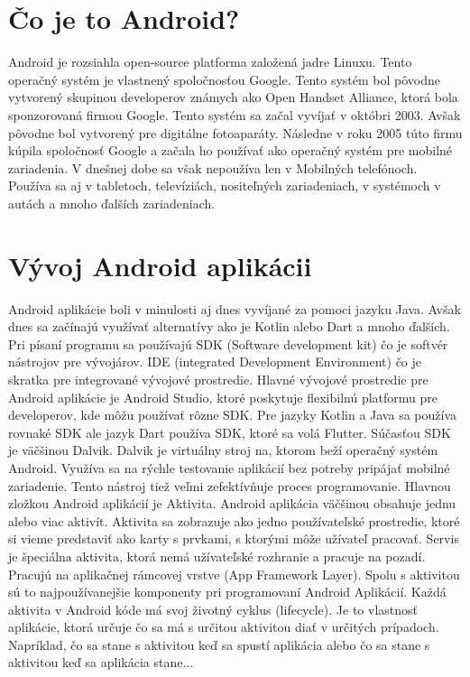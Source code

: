 \documentclass[10pt,twoside,slovak,a4paper]{article}
\begin{document}
\section{Čo je to Android?} \label{Čo je to Android?}
Android je rozsiahla open-source platforma založená jadre Linuxu. Tento operačný systém je vlastnený spoločnosťou Google. Tento systém bol pôvodne vytvorený skupinou developerov známych ako Open Handset Alliance, ktorá bola sponzorovaná firmou Google. \newline
Tento systém sa začal vyvíjať v októbri 2003. Avšak pôvodne bol vytvorený pre digitálne fotoaparáty. Následne v roku 2005 túto firmu kúpila spoločnosť Google a začala ho používať ako operačný systém pre mobilné zariadenia. \newline
V dnešnej dobe sa však nepoužíva len v  Mobilných telefónoch. Používa sa aj v tabletoch, televíziách, nositeľných zariadeniach, v systémoch v autách a mnoho ďalších zariadeniach.



\section{Vývoj Android aplikácii } \label{Vývoj Android aplikácii}

Android aplikácie boli v minulosti aj dnes vyvíjané za pomoci jazyku Java.\cite{9032440} Avšak dnes sa začínajú využívať alternatívy ako je Kotlin alebo Dart a mnoho ďalších. Pri písaní programu sa používajú SDK (Software development kit) čo je softvér nástrojov pre vývojárov. IDE (integrated Development Environment) čo je skratka pre integrované vývojové prostredie. \newline
Hlavné vývojové prostredie pre Android aplikácie je Android Studio, ktoré poskytuje flexibilnú platformu pre developerov, kde môžu používať rôzne SDK. Pre jazyky Kotlin a Java sa používa rovnaké SDK ale jazyk Dart používa SDK, ktoré sa volá Flutter. \newline
Súčasťou SDK je väčšinou Dalvik. Dalvik je virtuálny stroj na, ktorom beží operačný systém Android. Využíva sa na rýchle testovanie aplikácií bez potreby pripájať mobilné zariadenie. Tento nástroj tiež veľmi zefektívňuje proces programovanie.\newline
Hlavnou zložkou Android aplikácií je Aktivita. Android aplikácia väčšinou obsahuje jednu alebo viac aktivít. Aktivita sa zobrazuje ako jedno používateľské prostredie, ktoré si vieme predstaviť ako karty s prvkami, s ktorými môže užívateľ pracovať.\newline
Servis je špeciálna aktivita, ktorá nemá užívateľské rozhranie a pracuje na pozadí. Pracujú na aplikačnej rámcovej vrstve (App Framework Layer). Spolu s aktivitou sú to najpoužívanejšie komponenty pri programovaní Android Aplikácií. \newline
Každá aktivita v Android kóde má svoj životný cyklus (lifecycle). Je to vlastnosť aplikácie, ktorá určuje čo sa má s určitou aktivitou diať v určitých prípadoch. Napríklad, čo sa stane s aktivitou keď sa spustí aplikácia alebo čo sa stane s aktivitou keď sa aplikácia stane... 
\end{document}
